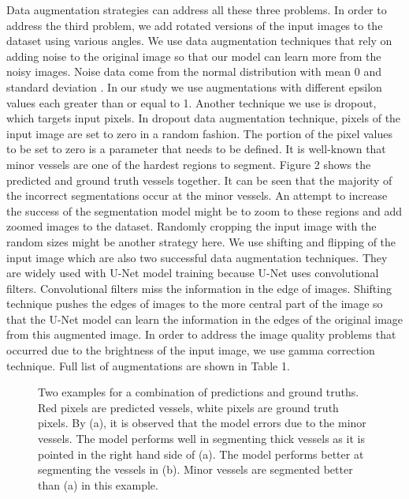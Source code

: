 \documentclass{article}
\begin{document}
Data augmentation strategies can address all these three problems. In order to address the third problem, we add rotated versions of the input images to the dataset using various angles. We use data augmentation techniques that rely on adding noise to the original image so that our model can learn more from the noisy images. Noise data come from the normal distribution with mean 0 and standard deviation . In our study we use augmentations with different epsilon values each greater than or equal to 1. Another technique we use is dropout, which targets input pixels. In dropout data augmentation technique, pixels of the input image are set to zero in a random fashion. The portion of the pixel values to be set to zero is a parameter that needs to be defined. It is well-known that minor vessels are one of the hardest regions to segment. Figure 2 shows the predicted and ground truth vessels together. It can be seen that the majority of the incorrect segmentations occur at the minor vessels. An attempt to increase the success of the segmentation model might be to zoom to these regions and add zoomed images to the dataset. Randomly cropping the input image with the random sizes might be another strategy here. We use shifting and flipping of the input image which are also two successful data augmentation techniques. They are widely used with U-Net model training because U-Net uses convolutional filters. Convolutional filters miss the information in the edge of images. Shifting technique pushes the edges of images to the more central part of the image so that the U-Net model can learn the information in the edges of the original image from this augmented image. In order to address the image quality problems that occurred due to the brightness of the input image, we use gamma correction technique. Full list of augmentations are shown in Table 1.

\begin{figure}\centering
    \qquad
    \caption{Two examples for a combination of predictions and ground truths. Red pixels are predicted vessels, white pixels are ground truth pixels. By (a), it is observed that the model errors due to the minor vessels. The model performs well in segmenting thick vessels as it is pointed in the right hand side of (a). The model performs better at segmenting the vessels in (b). Minor vessels are segmented better than (a) in this example.}\label{fig:twodriwe}
\end{figure}
\end{document}
